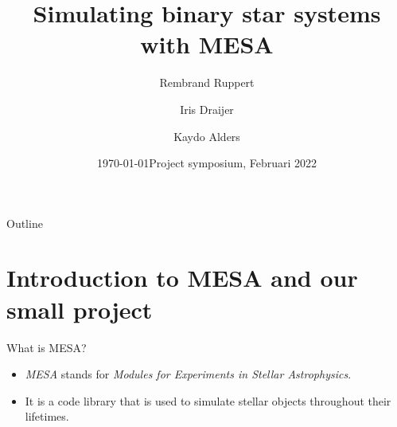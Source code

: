 \documentclass{beamer}
\title{Simulating binary star systems with MESA}
\author{Rembrand Ruppert \and Iris Draijer \and Kaydo Alders}
\institute[UvA] %
{
  University of Amsterdam\\
  Anton Pannekoek institute\\
  Supervisor: Philipp Moestra
}
\date[\today]{\today}
\date{Project symposium, Februari 2022}
\begin{document}
\frame{\titlepage}

\begin{frame}{Outline}
    \tableofcontents
\end{frame}

\section{Introduction to MESA and our small project}

\begin{frame}{What is MESA?}
    \begin{itemize}
        \item<1-> \textit{MESA} stands for \textit{Modules for Experiments in Stellar Astrophysics}.
        \item<2-> It is a code library that is used to simulate stellar objects throughout their lifetimes. %
    \end{itemize}
\end{frame}
\end{document}
